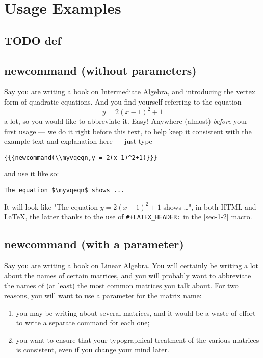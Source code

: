 \documentclass[11pt]{article}
\newcommand{\myvqeqn}{y = 2(x-1)^2+1}
\begin{document}
\section{Usage Examples}
\label{sec-4}

\subsection{{\bfseries\sffamily TODO} def}
\label{sec-4-1}

\subsection{newcommand (without parameters)}
\label{sec-4-2}


Say you are writing a book on Intermediate Algebra, and introducing
the vertex form of quadratic equations.  And you find yourself
referring to the equation \[\myvqeqn\] a lot, so you would like to
abbreviate it.  Easy!  Anywhere (almost) \emph{before} your first usage ---
we do it right before this text, to help keep it consistent with the
example text and explanation here --- just type
\begin{verbatim}
{{{newcommand(\\myvqeqn,y = 2(x-1)^2+1)}}}
\end{verbatim}
and use it like so:
\begin{verbatim}
The equation $\myvqeqn$ shows ...
\end{verbatim}
It will look like "The equation $\myvqeqn$ shows \ldots{}", in both HTML
and \LaTeX{}, the latter thanks to the use of \verb~#+LATEX_HEADER:~ in the
\ref{sec-1-2} macro.

\subsection{newcommand (with a parameter)}
\label{sec-4-3}


Say you are writing a book on Linear Algebra.  You will certainly be
writing a lot about the names of certain matrices, and you will
probably want to abbreviate the names of (at least) the most common
matrices you talk about.  For two reasons, you will want to use a
parameter for the matrix name:

\begin{enumerate}
\item you may be writing about several matrices, and it would be a waste
of effort to write a separate command for each one;
\item you want to ensure that your typographical treatment of the various
matrices is consistent, even if you change your mind later.
\end{enumerate}
\end{document}
